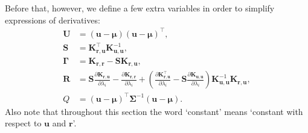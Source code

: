 \documentclass{mpaper}
\newcommand{\Kuu}{\mathbf{K}_{\mathbf{u},\mathbf{u}}}
\newcommand{\Krr}{\mathbf{K}_{\mathbf{r},\mathbf{r}}}
\newcommand{\Kru}{\mathbf{K}_{\mathbf{r},\mathbf{u}}}
\begin{document}
Before that, however, we define a few extra variables in order to simplify
expressions of derivatives:
\begin{align*}
  \mathbf{U} &= (\mathbf{u} - \bm\mu)(\mathbf{u} - \bm\mu)^\intercal, \\
  \mathbf{S} &= \Kru^\intercal\Kuu^{-1}, \\
  \bm\Gamma &= \Krr - \mathbf{S}\Kru, \\
  \mathbf{R} &= \mathbf{S}\frac{\partial \Kru}{\partial \lambda_i} - \frac{\partial \Krr}{\partial \lambda_i} + \left( \frac{\partial \Kru^\intercal}{\partial \lambda_i} - \mathbf{S}\frac{\partial \Kuu}{\partial \lambda_i} \right) \Kuu^{-1}\Kru, \\
  Q &= (\mathbf{u} - \bm\mu)^\intercal\bm\Sigma^{-1}(\mathbf{u} - \bm\mu).
\end{align*}
Also note that throughout this section the word `constant' means `constant with
respect to $\mathbf{u}$ and $\mathbf{r}$'.
\end{document}
